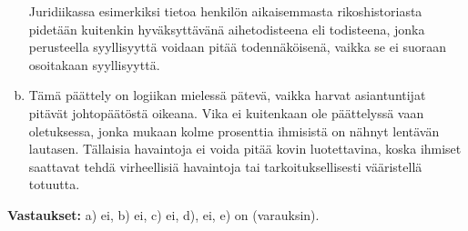 \begin{esimerkki}
\begin{enumerate}[a)]
                Juridiikassa esimerkiksi tietoa henkilön aikaisemmasta rikoshistoriasta pidetään kuitenkin
                hyväksyttävänä aihetodisteena eli todisteena, jonka perusteella syyllisyyttä voidaan pitää
                todennäköisenä, vaikka se ei suoraan osoitakaan syyllisyyttä.
            \item Tämä päättely on logiikan mielessä pätevä, vaikka harvat asiantuntijat pitävät johtopäätöstä oikeana.
                Vika ei kuitenkaan ole päättelyssä vaan oletuksessa, jonka mukaan kolme prosenttia ihmisistä on nähnyt 
                lentävän lautasen.
                Tällaisia havaintoja ei voida pitää kovin luotettavina, koska ihmiset saattavat tehdä virheellisiä 
                havaintoja tai tarkoituksellisesti vääristellä totuutta.
        \end{enumerate}
    \textbf{Vastaukset:}
        a) ei, b) ei, c) ei, d), ei, e) on (varauksin).
\end{esimerkki}

\Harjoitustehtavat

